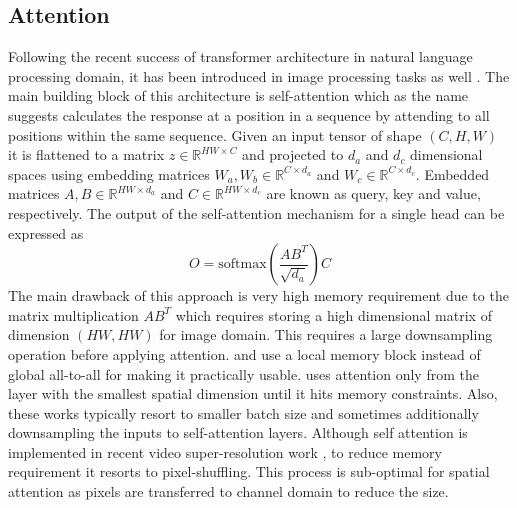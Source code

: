 \documentclass[10pt,twocolumn,letterpaper]{article}
\begin{document}
\subsection{Attention}
Following the recent success of transformer architecture \cite{vaswani2017attention} in natural language processing domain, it has been introduced in image processing tasks as well \cite{parmar2018image,liu2018non}. The main building block of this architecture is self-attention which as the name suggests calculates the response at a position in a sequence by attending to all positions within the same sequence. Given an input tensor of shape $(C,H,W)$ it is flattened to a matrix $z \in \mathbb{R}^{HW \times C}$ and projected to $d_a$ and $d_c$ dimensional spaces using embedding matrices $W_a,W_b \in \mathbb{R}^{C \times d_a}$ and $W_c \in \mathbb{R}^{C \times d_c}$. Embedded matrices $A,B \in \mathbb{R}^{HW \times d_a}$ and $C \in \mathbb{R}^{HW \times d_c}$ are known as query, key and value, respectively. The output of the self-attention mechanism for a single head can be expressed as
\begin{equation}\label{eq:qkv}
    O = \text{softmax} \left(\frac{AB^T}{\sqrt{d_a}} \right)C
\end{equation}
The main drawback of this approach is very high memory requirement due to the matrix multiplication $AB^T$ which requires storing a high dimensional matrix of dimension $(HW,HW)$ for image domain. This requires a large downsampling operation before applying attention. \cite{parmar2018image} and \cite{ramachandran2019stand} use a local memory block instead of global all-to-all for making it practically usable. \cite{bello2019attention} uses attention only from the layer with the smallest spatial dimension until it hits memory constraints. Also, these works typically resort to smaller batch size and sometimes additionally downsampling the inputs to self-attention layers. Although self attention is implemented in recent video super-resolution work \cite{yi2019progressive}, to reduce memory requirement it resorts to pixel-shuffling. This process is sub-optimal for spatial attention as pixels are transferred to channel domain to reduce the size.
\end{document}
